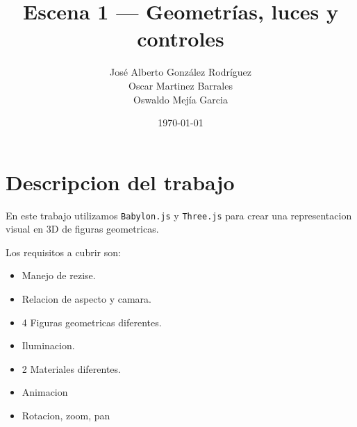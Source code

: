 \documentclass{article}
\begin{document}
\title{Escena 1 — Geometrías, luces y controles}
\author{José Alberto González Rodríguez \\ Oscar Martinez Barrales \\ Oswaldo Mejía Garcia}
\date{\today}

\maketitle

\section*{\centering Descripcion del trabajo}

En este trabajo utilizamos \texttt{Babylon.js} y \texttt{Three.js} para crear una representacion visual en 3D de figuras geometricas.

Los requisitos a cubrir son:
\begin{itemize}
    \item Manejo de rezise.
    \item Relacion de aspecto y camara.
    \item 4 Figuras geometricas diferentes.
    \item Iluminacion.
    \item 2 Materiales diferentes.
    \item Animacion
    \item Rotacion, zoom, pan
\end{itemize}
\end{document}
